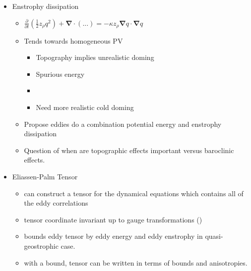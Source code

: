 \documentclass[10pt,a4paper]{article}
\begin{document}
                \begin{itemize}
                	\item Enstrophy dissipation
                	\begin{itemize}
                		\item $\frac{\partial  }{\partial t}\left(\frac{1}{2}z_{\rho}q^{2}\right) + \boldsymbol{\nabla}\cdot\left(...\right)=-\kappa z_\rho \boldsymbol{\nabla}q\cdot\boldsymbol{\nabla}q$
	                	\item Tends towards homogeneous PV
	                	\begin{itemize}
	                		\item Topography implies unrealistic doming
	                		\item Spurious energy
	                		\item \cite{adcock2000interactions}
	                		\item Need more realistic cold doming
	                	\end{itemize}
	                	\item Propose eddies do a combination potential energy and enstrophy dissipation 
	                	\item Question of when are topographic effects important versus baroclinic effects.            
	                \end{itemize}    
	                 
                	\item Eliassen-Palm Tensor   
                	\begin{itemize}      
                		\item can construct a tensor for the dynamical equations which contains all of the eddy correlations
                		\item tensor coordinate invariant up to gauge transformations (\cite{maddison2013eliassen})
                		\item \cite{marshall2012framework} bounds eddy tensor by eddy energy
                		and eddy enstrophy in quasi-geostrophic case.
                		\item with a bound, tensor can be written in terms of bounds 
                		and anisotropies.
                	\end{itemize}     
                	

\end{itemize}
\end{document}
